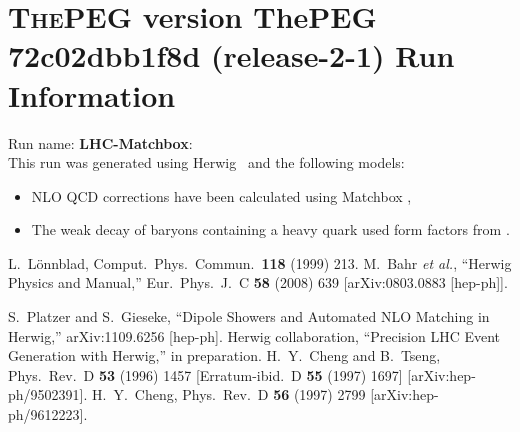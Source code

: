 \documentclass{article}
\begin{document}
\appendix
\section[xxx]{\textsc{ThePEG} version ThePEG 72c02dbb1f8d (release-2-1) \cite{ThePEG} Run Information}
Run name: \textbf{LHC-Matchbox}:\\
This run was generated using Herwig~\cite{Bahr:2008pv} and the following models:
\begin{itemize}
\item NLO QCD corrections have been calculated using Matchbox \cite{Platzer:2011bc}, \cite{Matchbox:2015}
\item The weak decay of baryons containing a heavy quark used form factors from \cite{Cheng:1995fe,Cheng:1996cs}.
\end{itemize}

\begin{thebibliography}{99}
 L.~L\"onnblad, Comput.~Phys.~Commun.\ {\bf 118} (1999) 213.
  M.~Bahr {\it et al.},
  ``Herwig Physics and Manual,''
  Eur.\ Phys.\ J.\  C {\bf 58} (2008) 639
  [arXiv:0803.0883 [hep-ph]].

S.~Platzer and S.~Gieseke,
``Dipole Showers and Automated NLO Matching in Herwig,''
arXiv:1109.6256 [hep-ph].
Herwig collaboration,
``Precision LHC Event Generation with Herwig,''
in preparation.
  H.~Y.~Cheng and B.~Tseng,
  Phys.\ Rev.\  D {\bf 53} (1996) 1457
  [Erratum-ibid.\  D {\bf 55} (1997) 1697]
  [arXiv:hep-ph/9502391].
  H.~Y.~Cheng,
  Phys.\ Rev.\  D {\bf 56} (1997) 2799
  [arXiv:hep-ph/9612223].

\end{thebibliography}
\end{document}
